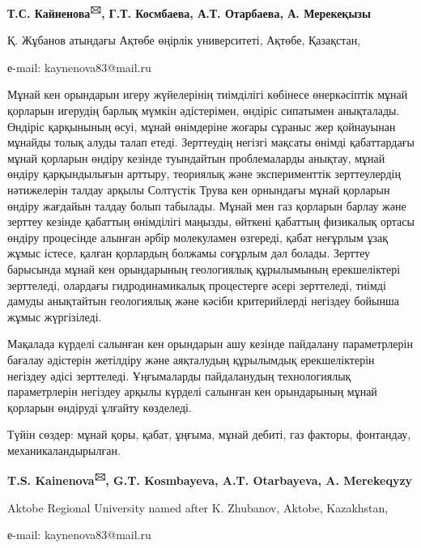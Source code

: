 \begin{center}
{\bfseries Т.С. Кайненова\textsuperscript{🖂}, Г.Т. Космбаева, А.Т.
Отарбаева, А. Мерекеқызы}

Қ. Жұбанов атындағы Ақтөбе өңірлік университеті, Ақтөбе, Қазақстан,

е-mail: kaynenova83@mail.ru
\end{center}

Мұнай кен орындарын игеру жүйелерінің тиімділігі көбінесе өнеркәсіптік
мұнай қорларын игерудің барлық мүмкін әдістерімен, өндіріс сипатымен
анықталады. Өндіріс қарқынының өсуі, мұнай өнімдеріне жоғары сұраныс жер
қойнауынан мұнайды толық алуды талап етеді. Зерттеудің негізгі мақсаты
өнімді қабаттардағы мұнай қорларын өндіру кезінде туындайтын
проблемаларды анықтау, мұнай өндіру қарқындылығын арттыру, теориялық
және эксперименттік зерттеулердің нәтижелерін талдау арқылы Солтүстік
Трува кен орнындағы мұнай қорларын өндіру жағдайын талдау болып
табылады. Мұнай мен газ қорларын барлау және зерттеу кезінде қабаттың
өнімділігі маңызды, өйткені қабаттың физикалық ортасы өндіру процесінде
алынған әрбір молекуламен өзгереді, қабат неғұрлым ұзақ жұмыс істесе,
қалған қорлардың болжамы соғұрлым дәл болады. Зерттеу барысында мұнай
кен орындарының геологиялық құрылымының ерекшеліктері зерттеледі,
олардағы гидродинамикалық процестерге әсері зерттеледі, тиімді дамуды
анықтайтын геологиялық және кәсіби критерийлерді негіздеу бойынша жұмыс
жүргізіледі.

Мақалада күрделі салынған кен орындарын ашу кезінде пайдалану
параметрлерін бағалау әдістерін жетілдіру және аяқталудың құрылымдық
ерекшеліктерін негіздеу әдісі зерттеледі. Ұңғымаларды пайдаланудың
технологиялық параметрлерін негіздеу арқылы күрделі салынған кен
орындарының мұнай қорларын өндіруді ұлғайту көзделеді.

Түйін сөздер: мұнай қоры, қабат, ұңғыма, мұнай дебиті, газ факторы,
фонтандау, механикаландырылған.


\begin{center}
{\bfseries T.S. Kainenova\textsuperscript{🖂}, G.T. Kosmbayeva, A.T.
Otarbayeva, A. Merekeqyzy}

Aktobe Regional University named after K. Zhubanov, Aktobe, Kazakhstan,

е-mail: kaynenova83@mail.ru
\end{center}

